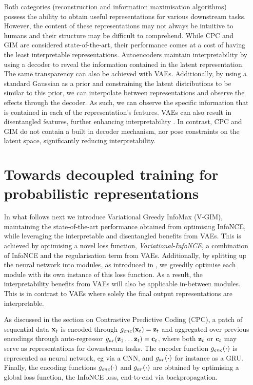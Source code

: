 		Both categories (reconstruction and information maximisation algorithms) possess the ability to obtain useful representations for various downstream tasks. However, the content of these representations may not always be intuitive to humans and their structure may be difficult to comprehend. While CPC and GIM are considered state-of-the-art, their performance comes at a cost of having the least interpretable representations. Autoencoders maintain interpretability by using a decoder to reveal the information contained in the latent representation. The same transparency can also be achieved with VAEs. Additionally, by using a standard Gaussian as a prior and constraining the latent distributions to be similar to this prior, we can interpolate between representations and observe the effects through the decoder. As such, we can observe the specific information that is contained in each of the representation's features. VAEs can also result in disentangled features, further enhancing interpretability \cite{grossuttiDeepLearningInfrared2022}. In contrast, CPC and GIM do not contain a built in decoder mechanism, nor pose constraints on the latent space, significantly reducing interpretability.
		


\section{Towards decoupled training for probabilistic representations}
		In what follows next we introduce Variational Greedy InfoMax (V-GIM), maintaining the state-of-the-art performance obtained from optimising InfoNCE, while leveraging the interpretable and disentangled benefits from VAEs. This is achieved by optimising a novel loss function, \textit{Variational-InfoNCE}, a combination of InfoNCE and the regularisation term from VAEs. Additionally, by splitting up the neural network into modules, as introduced in \cite{lowePuttingEndEndtoEnd2020}, we greedily optimise each module with its own instance of this loss function. As a result, the interpretability benefits from VAEs will also be applicable in-between modules. This is in contrast to VAEs where solely the final output representations are interpretable.		
				
		
		As discussed in the section on Contrastive Predictive Coding (CPC), a patch of sequential data $\mathbf{x}_t$ is encoded through $g_{enc}(\mathbf{x}_t) = \mathbf{z}_t$ and aggregated over previous encodings through auto-regressor $g_{ar}(\mathbf{z}_1  \dots \mathbf{z}_t) = \mathbf{c}_t$, where both $\mathbf{z}_t$ or $\mathbf{c}_t$ may serve as representations for downstream tasks. The encoder function $g_{enc}(\cdot)$ is represented as neural network, eg via a CNN, and $g_{ar}(\cdot)$ for instance as a GRU. %
		Finally, the encoding functions $g_{enc}(\cdot)$ and $g_{ar}(\cdot)$ are obtained by optimising a global loss function, the InfoNCE loss, end-to-end via backpropagation. 

